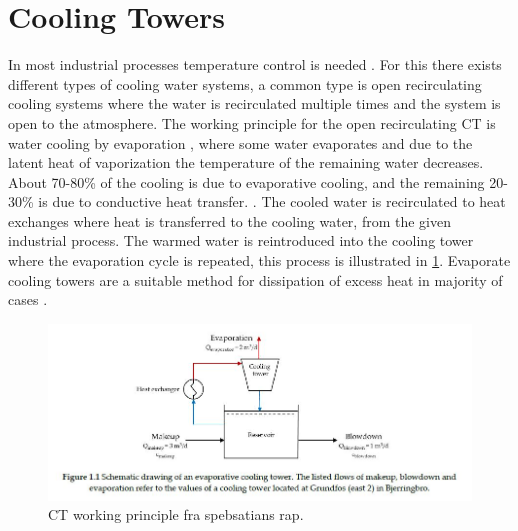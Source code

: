 
\section{Cooling Towers}

In most industrial processes temperature control is needed \citep{ReviewStudyCoolingtower_2019}. 
For this there exists different types of cooling water systems, 
a common type is open recirculating cooling systems where the water is recirculated multiple times and the system is open to the atmosphere. 
The working principle for the open recirculating CT is water cooling by evaporation \citep{PlantEngineerBookReference2001}, where some water evaporates and
due to the latent heat of vaporization the temperature of the remaining water decreases. %
About 70-80\% of the cooling is due to evaporative cooling, and the remaining 20-30\% is due to conductive heat transfer. \citep{IntroductionCoolingTower2014}. 
The cooled water is recirculated to heat exchanges where heat is transferred to the cooling water, from the given industrial process. 
The warmed water is reintroduced into the cooling tower where the evaporation cycle is repeated, this process is illustrated in \cref{fig:CT_working_principle}. \citep{IntroductionCoolingTower2014} 
Evaporate cooling towers are a suitable method for dissipation of excess heat in majority of cases \citep{PlantEngineerBookReference2001}. 

\begin{figure}[H]
    \centering
    \includegraphics[width=1\textwidth]{Billeder/intro/sebastian_CT_principle.JPG}
    \caption{CT working principle fra spebsatians rap. }
    \label{fig:CT_working_principle}
\end{figure}



